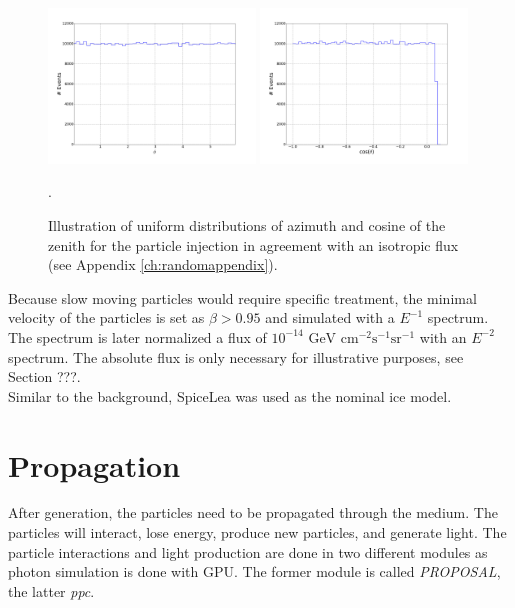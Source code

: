 \begin{figure}[t]
\centering
\includegraphics[width=0.49\textwidth]{chapter6/img/Azimuth}
\includegraphics[width=0.49\textwidth]{chapter6/img/Zenith}
\caption{Illustration of uniform distributions of azimuth and cosine of the zenith for the particle injection in agreement with an isotropic flux (see Appendix \ref{ch:randomappendix}).}.
\label{fig:angles}
\end{figure}

\noindent Because slow moving particles would require specific treatment, the minimal velocity of the particles is set as $\beta > 0.95$ and simulated with a $E^{-1}$ spectrum. The spectrum is later normalized a flux of $10^{-14} \textrm{ GeV } \textrm{cm}^{-2} \textrm{s}^{-1} \textrm{sr}^{-1}$ with an $E^{-2}$ spectrum. The absolute flux is only necessary for illustrative purposes, see Section ???.\\

\noindent Similar to the background, SpiceLea was used as the nominal ice model.

\section{Propagation}
After generation, the particles need to be propagated through the medium. The particles will interact, lose energy, produce new particles, and generate light. The particle interactions and light production are done in two different modules as photon simulation is done with GPU. The former module is called \textit{PROPOSAL}, the latter \textit{ppc}.




